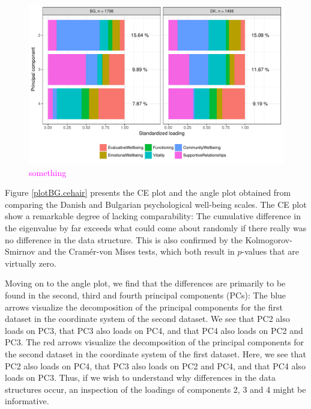 \documentclass[titlepage,11pt,twoside]{article}
\newcommand{\hl}[1]{\textcolor{magenta}{#1}}
\begin{document}
\begin{figure}
\center
\includegraphics[scale = 0.7]{essDKBGpancake234.pdf}
\caption{\hl{something}}
\label{plotBG.pancake}
\end{figure}




Figure \ref{plotBG.cehair} presents the CE plot and the angle plot obtained from comparing the Danish and Bulgarian psychological well-being scales. The CE plot show a remarkable degree of lacking comparability: The cumulative difference in the eigenvalue by far exceeds what could come about randomly if there really was no difference in the data structure. This is also confirmed by the Kolmogorov-Smirnov and the Cram\'er-von Mises tests, which both result in $p$-values that are virtually zero.

Moving on to the angle plot, we find that the differences are primarily to be found in the second, third and fourth principal components (PCs): The blue arrows visualize the decomposition of the principal components for the first dataset in the coordinate system of the second dataset. We see that PC2 also loads on PC3, that PC3 also loads on PC4, and that PC4 also loads on PC2 and PC3. The red arrows visualize the decomposition of the principal components for the second dataset in the coordinate system of the first dataset. Here, we see that PC2 also loads on PC4, that PC3 also loads on PC2 and PC4, and that PC4 also loads on PC3. Thus, if we wish to understand why differences in the data structures occur, an inspection of the loadings of components 2, 3 and 4 might be informative.
\end{document}
